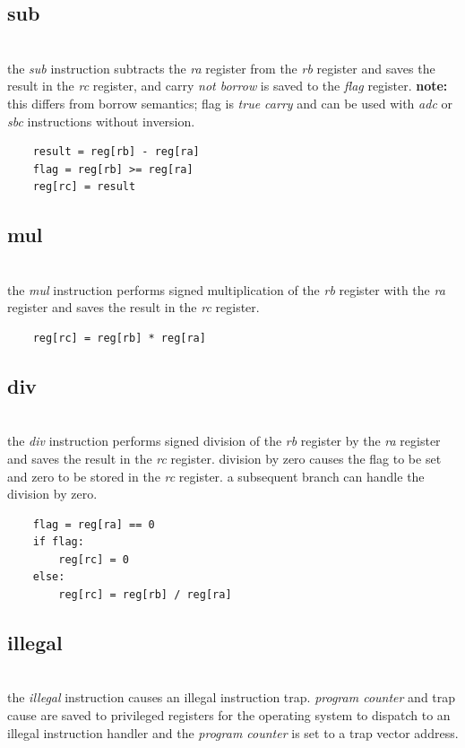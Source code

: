 \subsection{sub}
\\
the \emph{sub} instruction subtracts the \emph{ra} register from
the \emph{rb} register and saves the result in the \emph{rc} register,
and carry \emph{not borrow} is saved to the \emph{flag} register.
\textbf{note:} this differs from borrow semantics; flag is \emph{true carry}
and can be used with \emph{adc} or \emph{sbc} instructions without inversion.
\begin{Verbatim}
    result = reg[rb] - reg[ra]
    flag = reg[rb] >= reg[ra]
    reg[rc] = result
\end{Verbatim}

\subsection{mul}
\\
the \emph{mul} instruction performs signed multiplication of the
\emph{rb} register with the \emph{ra} register and saves the
result in the \emph{rc} register.
\begin{Verbatim}
    reg[rc] = reg[rb] * reg[ra]
\end{Verbatim}

\subsection{div}
\\
the \emph{div} instruction performs signed division of the
\emph{rb} register by the \emph{ra} register and saves the
result in the \emph{rc} register. division by zero causes
the flag to be set and zero to be stored in the \emph{rc} register.
a subsequent branch can handle the division by zero.
\begin{Verbatim}
    flag = reg[ra] == 0
    if flag:
        reg[rc] = 0
    else:
        reg[rc] = reg[rb] / reg[ra]
\end{Verbatim}

\subsection{illegal}
\\
the \emph{illegal} instruction causes an illegal instruction trap.
\emph{program counter} and trap cause are saved to privileged registers
for the operating system to dispatch to an illegal instruction handler
and the \emph{program counter} is set to a trap vector address.

